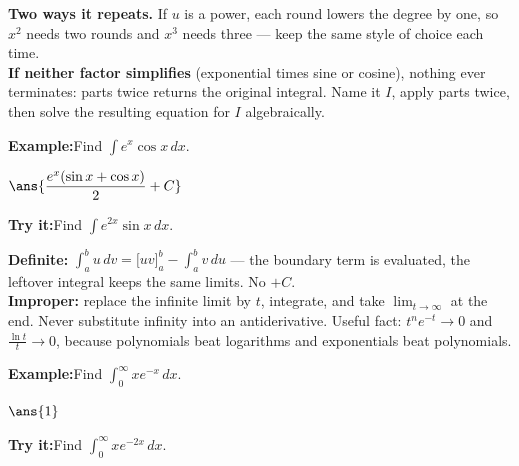 \documentclass[12pt]{article}
\begin{document}
\begin{formulabox}
\textbf{Two ways it repeats.} If $u$ is a power, each round lowers the degree by
one, so $x^{2}$ needs two rounds and $x^{3}$ needs three --- keep the same style
of choice each time.\\[3pt]
\textbf{If neither factor simplifies} (exponential times sine or cosine),
nothing ever terminates: parts twice returns the original integral. Name it
$I$, apply parts twice, then solve the resulting equation for $I$ algebraically.
\end{formulabox}
\begin{examplebox}
\textbf{Example:}\quad Find $\displaystyle\int e^{x}\cos x\,dx$.

$\ans{\dfrac{e^{x}(\sin x + \cos x)}{2} + C}$
\end{examplebox}
\begin{tryitbox}
\textbf{Try it:}\quad Find $\displaystyle\int e^{2x}\sin x\,dx$.\\[2pt]
\end{tryitbox}

\begin{formulabox}
\textbf{Definite:} $\displaystyle\int_{a}^{b} u\,dv = \Big[uv\Big]_{a}^{b} - \int_{a}^{b} v\,du$
--- the boundary term is evaluated, the leftover integral keeps the same limits.
No $+ C$.\\[3pt]
\textbf{Improper:} replace the infinite limit by $t$, integrate, and take
$\lim_{t \to \infty}$ at the end. Never substitute infinity into an
antiderivative. Useful fact: $t^{n}e^{-t} \to 0$ and $\frac{\ln t}{t} \to 0$,
because polynomials beat logarithms and exponentials beat polynomials.
\end{formulabox}
\begin{examplebox}
\textbf{Example:}\quad Find $\displaystyle\int_{0}^{\infty} x e^{-x}\,dx$.

$\ans{1}$
\end{examplebox}
\begin{tryitbox}
\textbf{Try it:}\quad Find $\displaystyle\int_{0}^{\infty} x e^{-2x}\,dx$.\\[2pt]
\end{tryitbox}
\end{document}
